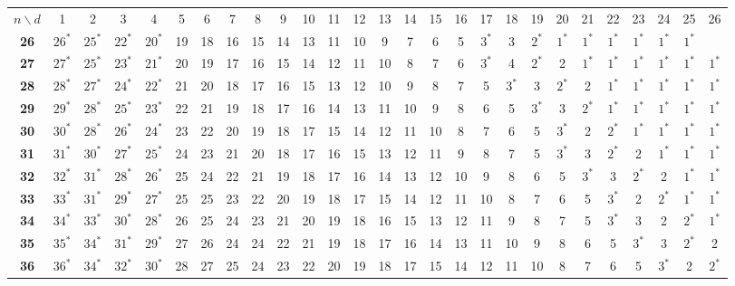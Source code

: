 \begin{landscape}
{\smaller[2]
\begin{table}
\begin{tabular}{|c| c c c c c c c c c c c c c c c c c c c c c c c c c c |}
\hline
$n \backslash  d$ & 1 & 2 & 3 & 4 & 5 & 6 & 7 & 8 & 9 & 10 & 11 & 12 & 13 & 14 & 15 & 16 & 17 & 18 & 19 & 20 & 21 & 22 & 23 & 24 & 25 & 26 \\
\Xhline{4\arrayrulewidth}
\textbf{26} & $26^*$ & $25^*$ & $22^*$ & $20^*$ & 19 & 18 & 16 & 15 & 14 & 13 & 11 & 10 & 9 & 7 & 6 & 5 & $3^*$ & 3 & $2^*$ & $1^*$ & $1^*$ & $1^*$ & $1^*$ & $1^*$ & $1^*$ & \\
\textbf{27} & $27^*$ & $25^*$ & $23^*$ & $21^*$ & 20 & 19 & 17 & 16 & 15 & 14 & 12 & 11 & 10 & 8 & 7 & 6 & $3^*$ & 4 & $2^*$ & 2 & $1^*$ & $1^*$ & $1^*$ & $1^*$ & $1^*$ & $1^*$ \\
\textbf{28} & $28^*$ & $27^*$ & $24^*$ & $22^*$ & 21 & 20 & 18 & 17 & 16 & 15 & 13 & 12 & 10 & 9 & 8 & 7 & 5 & $3^*$ & 3 & $2^*$ & 2 & $1^*$ & $1^*$ & $1^*$ & $1^*$ & $1^*$ \\
\textbf{29} & $29^*$ & $28^*$ & $25^*$ & $23^*$ & 22 & 21 & 19 & 18 & 17 & 16 & 14 & 13 & 11 & 10 & 9 & 8 & 6 & 5 & $3^*$ & 3 & $2^*$ & $1^*$ & $1^*$ & $1^*$ & $1^*$ & $1^*$ \\
\textbf{30} & $30^*$ & $28^*$ & $26^*$ & $24^*$ & 23 & 22 & 20 & 19 & 18 & 17 & 15 & 14 & 12 & 11 & 10 & 8 & 7 & 6 & 5 & $3^*$ & 2 & $2^*$ & $1^*$ & $1^*$ & $1^*$ & $1^*$ \\
\textbf{31} & $31^*$ & $30^*$ & $27^*$ & $25^*$ & 24 & 23 & 21 & 20 & 18 & 17 & 16 & 15 & 13 & 12 & 11 & 9 & 8 & 7 & 5 & $3^*$ & 3 & $2^*$ & 2 & $1^*$ & $1^*$ & $1^*$ \\
\textbf{32} & $32^*$ & $31^*$ & $28^*$ & $26^*$ & 25 & 24 & 22 & 21 & 19 & 18 & 17 & 16 & 14 & 13 & 12 & 10 & 9 & 8 & 6 & 5 & $3^*$ & 3 & $2^*$ & 2 & $1^*$ & $1^*$ \\
\textbf{33} & $33^*$ & $31^*$ & $29^*$ & $27^*$ & 25 & 25 & 23 & 22 & 20 & 19 & 18 & 17 & 15 & 14 & 12 & 11 & 10 & 8 & 7 & 6 & 5 & $3^*$ & 2 & $2^*$ & $1^*$ & $1^*$ \\
\textbf{34} & $34^*$ & $33^*$ & $30^*$ & $28^*$ & 26 & 25 & 24 & 23 & 21 & 20 & 19 & 18 & 16 & 15 & 13 & 12 & 11 & 9 & 8 & 7 & 5 & $3^*$ & 3 & 2 & $2^*$ & $1^*$ \\
\textbf{35} & $35^*$ & $34^*$ & $31^*$ & $29^*$ & 27 & 26 & 24 & 24 & 22 & 21 & 19 & 18 & 17 & 16 & 14 & 13 & 11 & 10 & 9 & 8 & 6 & 5 & $3^*$ & 3 & $2^*$ & 2 \\
\textbf{36} & $36^*$ & $34^*$ & $32^*$ & $30^*$ & 28 & 27 & 25 & 24 & 23 & 22 & 20 & 19 & 18 & 17 & 15 & 14 & 12 & 11 & 10 & 8 & 7 & 6 & 5 & $3^*$ & 2 & $2^*$ \\

\end{tabular}
\end{table}}
\end{landscape}
